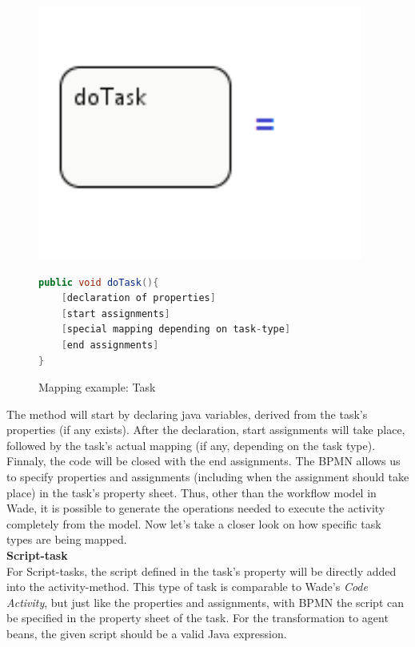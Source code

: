 \begin{figure}[h]
\begin{minipage}[c]{0.3\textwidth}
\includegraphics[width=0.95\textwidth]{images/mapping/task.png}
\end{minipage}
\begin{minipage}[c]{0.7\textwidth}
\begin{lstlisting}[language=Java]
public void doTask(){
	[declaration of properties]
	[start assignments]
	[special mapping depending on task-type]
	[end assignments]
}
\end{lstlisting}
\end{minipage}
\caption{Mapping example: Task}%
\label{fig:mapping_task}%
\end{figure}
\newpage
The method will start by declaring java variables, derived from the task's properties (if any exists). After the declaration, start assignments will take place, followed by the task's actual mapping (if any, depending on the task type). Finnaly, the code will be closed with the end assignments. The BPMN allows us to specify properties and assignments (including when the assignment should take place) in the task's property sheet. Thus, other than the workflow model in Wade, it is possible to generate the operations needed to execute the activity completely from the model. Now let's take a closer look on how specific task types are being mapped.\\

\textbf{Script-task}\\
For Script-tasks, the script defined in the task's property will be directly added into the activity-method. This type of task is comparable to Wade's \textit{Code Activity}, but just like the properties and assignments, with BPMN the script can be specified in the property sheet of the task. For the transformation to agent beans, the given script should be a valid Java expression. \\\\


